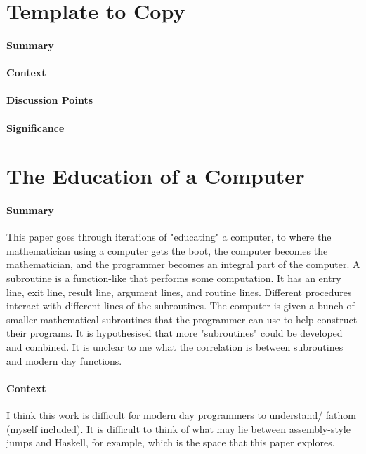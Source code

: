 \section {Template to Copy}

\paragraph{\textbf{Summary}}
\paragraph{\textbf{Context}}
\paragraph{\textbf{Discussion Points}}
\paragraph{\textbf{Significance}}

\section {The Education of a Computer \cite{hopper1952education}}

\paragraph{\textbf{Summary}}
This paper goes through iterations of "educating" a computer, to where the
mathematician using a computer gets the boot, the computer becomes the
mathematician, and the programmer becomes an integral part of the computer. A
subroutine is a function-like that performs some computation. It has an entry
line, exit line, result line, argument lines, and routine lines. Different
procedures interact with different lines of the subroutines. The computer is
given a bunch of smaller mathematical subroutines that the programmer can use to
help construct their programs. It is hypothesised that more "subroutines" could
be developed and combined. It is unclear to me what the correlation is between
subroutines and modern day functions.
\paragraph{\textbf{Context}}
I think this work is difficult for modern day programmers to understand/ fathom
(myself included). It is difficult to think of what may lie between
assembly-style jumps and Haskell, for example, which is the space that this
paper explores.
